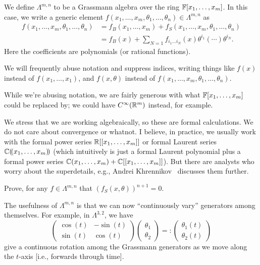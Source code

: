 \begin{definition}
We define $\Lambda^{m,n}$ to be a Grassmann algebra over the ring
$\mathbb{F}[x_{1},\dots,x_{m}]$. In this case, we write a generic element
$f(x_{1},\dots,x_{m},\theta_{1},\dots,\theta_{n})\in\Lambda^{m,n}$ as
\begin{equation}
  \begin{split}
  f(x_{1},\dots,x_{m},\theta_{1},\dots,\theta_{n})
&= f_{B}(x_{1},\dots,x_{m}) + f_{S}(x_{1},\dots,x_{m},\theta_{1},\dots,\theta_{n})\\
&= f_{B}(x) + \sum_{N=1}f_{i_{1}\dots i_{N}}(x)\theta^{i_{1}}(\cdots)\theta^{i_{N}}.
  \end{split}
\end{equation}
Here the coefficients are polynomials (or rational functions).
\end{definition}

\begin{remark}
We will frequently abuse notation and suppress indices, writing things
like $f(x)$ instead of $f(x_{1},\dots,x_{1})$, and $f(x,\theta)$ instead
of $f(x_{1},\dots,x_{m},\theta_{1},\dots,\theta_{n})$.

While we're abusing notation, we are fairly generous with what
$\mathbb{F}[x_{1},\dots,x_{m}]$ could be replaced by; we could have
$C^{\infty}(\mathbb{R}^{m})$ instead, for example.
\end{remark}

\begin{remark}
We stress that we are working algebraically, so these are formal
calculations. We do not care about convergence or whatnot. I believe, in
practice, we usually work with the formal power series $\mathbb{R}[[x_{1},\dots,x_{m}]]$
or formal Laurent series $\mathbb{C}(\!(x_{1},\dots,x_{m})\!)$ (which intuitively
is just a formal Laurent polynomial plus a formal power series $\mathbb{C}(x_{1},\dots,x_{m}) + \mathbb{C}[[x_{1},\dots,x_{m}]]$).
But there are analysts who worry about the superdetails, e.g., Andrei
Khrennikov~\cite{Khrennikov:1999bd} discusses them further.
\end{remark}

\begin{exercise}
Prove, for any $f\in\Lambda^{m,n}$ that $(f_{S}(x,\theta))^{n+1}=0$.
\end{exercise}

\M
The usefulness of $\Lambda^{m,n}$ is that we can now ``continuously
vary'' generators among themselves. For example, in $\Lambda^{3,2}$, we
have
\begin{equation}
  \begin{pmatrix}
    \cos(t) & -\sin(t)\\
    \sin(t) &  \cos(t)
  \end{pmatrix}\begin{pmatrix}\theta_{1}\\\theta_{2}
  \end{pmatrix} =: \begin{pmatrix}\theta_{1}(t)\\\theta_{2}(t)
  \end{pmatrix}
\end{equation}
give a continuous rotation among the Grassmann generators as we move
along the $t$-axis [i.e., forwards through time].

